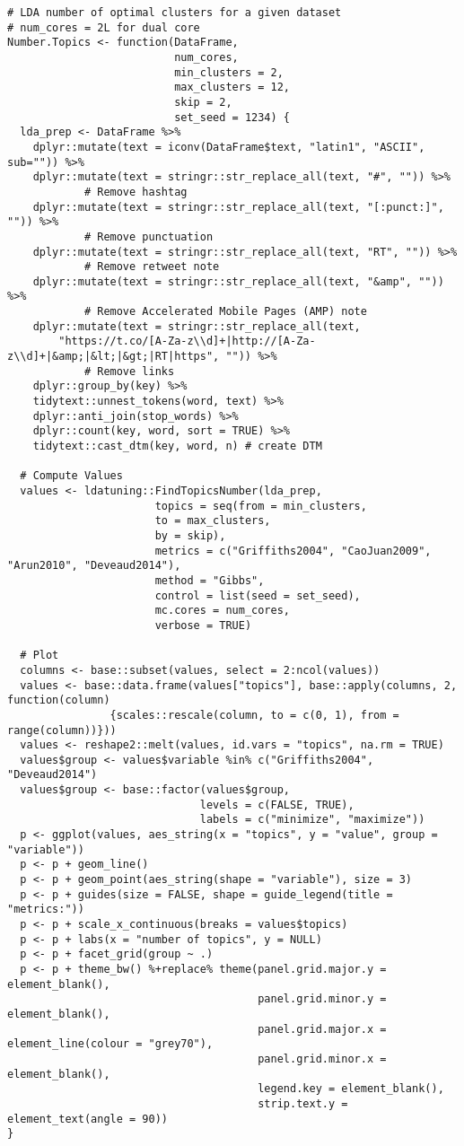 \begin{lstlisting}
# LDA number of optimal clusters for a given dataset
# num_cores = 2L for dual core
Number.Topics <- function(DataFrame, 
                          num_cores, 
                          min_clusters = 2, 
                          max_clusters = 12, 
                          skip = 2, 
                          set_seed = 1234) {
  lda_prep <- DataFrame %>% 
    dplyr::mutate(text = iconv(DataFrame$text, "latin1", "ASCII", sub="")) %>% 
    dplyr::mutate(text = stringr::str_replace_all(text, "#", "")) %>% 
    		# Remove hashtag
    dplyr::mutate(text = stringr::str_replace_all(text, "[:punct:]", "")) %>% 
    		# Remove punctuation
    dplyr::mutate(text = stringr::str_replace_all(text, "RT", "")) %>% 
    		# Remove retweet note
    dplyr::mutate(text = stringr::str_replace_all(text, "&amp", "")) %>% 
    		# Remove Accelerated Mobile Pages (AMP) note
    dplyr::mutate(text = stringr::str_replace_all(text, 
    	"https://t.co/[A-Za-z\\d]+|http://[A-Za-z\\d]+|&amp;|&lt;|&gt;|RT|https", "")) %>%  
            # Remove links
    dplyr::group_by(key) %>%
    tidytext::unnest_tokens(word, text) %>% 
    dplyr::anti_join(stop_words) %>% 
    dplyr::count(key, word, sort = TRUE) %>% 
    tidytext::cast_dtm(key, word, n) # create DTM
  
  # Compute Values
  values <- ldatuning::FindTopicsNumber(lda_prep, 
                       topics = seq(from = min_clusters, 
                       to = max_clusters, 
                       by = skip),
                       metrics = c("Griffiths2004", "CaoJuan2009", "Arun2010", "Deveaud2014"),
                       method = "Gibbs",
                       control = list(seed = set_seed),
                       mc.cores = num_cores,
                       verbose = TRUE)
  
  # Plot
  columns <- base::subset(values, select = 2:ncol(values))
  values <- base::data.frame(values["topics"], base::apply(columns, 2, function(column) 
  				{scales::rescale(column, to = c(0, 1), from = range(column))}))
  values <- reshape2::melt(values, id.vars = "topics", na.rm = TRUE)
  values$group <- values$variable %in% c("Griffiths2004", "Deveaud2014")
  values$group <- base::factor(values$group, 
                              levels = c(FALSE, TRUE), 
                              labels = c("minimize", "maximize"))
  p <- ggplot(values, aes_string(x = "topics", y = "value", group = "variable"))
  p <- p + geom_line()
  p <- p + geom_point(aes_string(shape = "variable"), size = 3)
  p <- p + guides(size = FALSE, shape = guide_legend(title = "metrics:"))
  p <- p + scale_x_continuous(breaks = values$topics)
  p <- p + labs(x = "number of topics", y = NULL)
  p <- p + facet_grid(group ~ .)
  p <- p + theme_bw() %+replace% theme(panel.grid.major.y = element_blank(), 
                                       panel.grid.minor.y = element_blank(), 
                                       panel.grid.major.x = element_line(colour = "grey70"), 
                                       panel.grid.minor.x = element_blank(), 
                                       legend.key = element_blank(), 
                                       strip.text.y = element_text(angle = 90))
}



\end{lstlisting}
